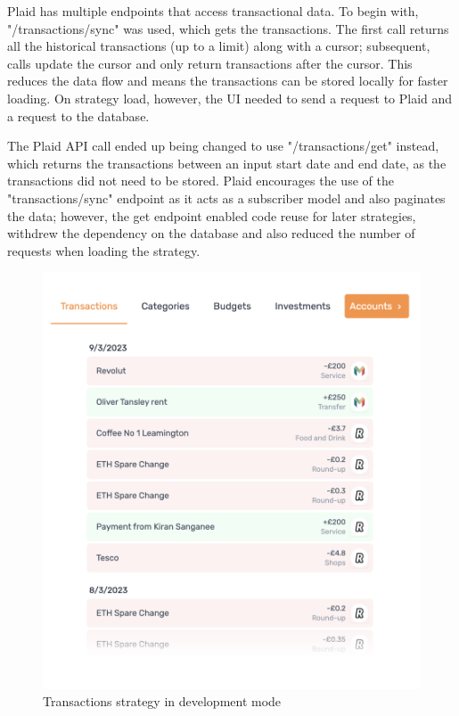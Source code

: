 Plaid has multiple endpoints that access transactional data. To begin with, "/transactions/sync" was used, which gets the transactions. The first call returns all the historical transactions (up to a limit) along with a cursor; subsequent, calls update the cursor and only return transactions after the cursor. This reduces the data flow and means the transactions can be stored locally for faster loading. On strategy load, however, the UI needed to send a request to Plaid and a request to the database.

The Plaid API call ended up being changed to use "/transactions/get" instead, which returns the transactions between an input start date and end date, as the transactions did not need to be stored. Plaid encourages the use of the "transactions/sync" endpoint as it acts as a subscriber model and also paginates the data; however, the get endpoint enabled code reuse for later strategies, withdrew the dependency on the database and also reduced the number of requests when loading the strategy.

\begin{figure}[H]
	\centering
	\includegraphics[width=\textwidth]{images/Transactions_development.png}
	\caption{Transactions strategy in development mode}
	\label{fig:TransactionsStrategy}
\end{figure}

